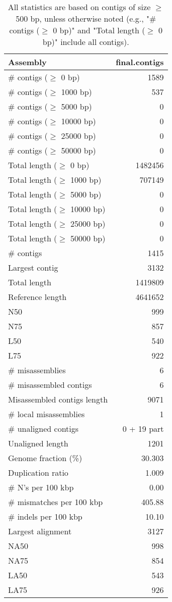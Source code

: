 \documentclass[12pt,a4paper]{article}
\begin{document}
\begin{table}[ht]
\begin{center}
\caption{All statistics are based on contigs of size $\geq$ 500 bp, unless otherwise noted (e.g., "\# contigs ($\geq$ 0 bp)" and "Total length ($\geq$ 0 bp)" include all contigs).}
\begin{tabular}{|l*{1}{|r}|}
\hline
Assembly & final.contigs \\ \hline
\# contigs ($\geq$ 0 bp) & 1589 \\ \hline
\# contigs ($\geq$ 1000 bp) & 537 \\ \hline
\# contigs ($\geq$ 5000 bp) & 0 \\ \hline
\# contigs ($\geq$ 10000 bp) & 0 \\ \hline
\# contigs ($\geq$ 25000 bp) & 0 \\ \hline
\# contigs ($\geq$ 50000 bp) & 0 \\ \hline
Total length ($\geq$ 0 bp) & 1482456 \\ \hline
Total length ($\geq$ 1000 bp) & 707149 \\ \hline
Total length ($\geq$ 5000 bp) & 0 \\ \hline
Total length ($\geq$ 10000 bp) & 0 \\ \hline
Total length ($\geq$ 25000 bp) & 0 \\ \hline
Total length ($\geq$ 50000 bp) & 0 \\ \hline
\# contigs & 1415 \\ \hline
Largest contig & 3132 \\ \hline
Total length & 1419809 \\ \hline
Reference length & 4641652 \\ \hline
N50 & 999 \\ \hline
N75 & 857 \\ \hline
L50 & 540 \\ \hline
L75 & 922 \\ \hline
\# misassemblies & 6 \\ \hline
\# misassembled contigs & 6 \\ \hline
Misassembled contigs length & 9071 \\ \hline
\# local misassemblies & 1 \\ \hline
\# unaligned contigs & 0 + 19 part \\ \hline
Unaligned length & 1201 \\ \hline
Genome fraction (\%) & 30.303 \\ \hline
Duplication ratio & 1.009 \\ \hline
\# N's per 100 kbp & 0.00 \\ \hline
\# mismatches per 100 kbp & 405.88 \\ \hline
\# indels per 100 kbp & 10.10 \\ \hline
Largest alignment & 3127 \\ \hline
NA50 & 998 \\ \hline
NA75 & 854 \\ \hline
LA50 & 543 \\ \hline
LA75 & 926 \\ \hline
\end{tabular}
\end{center}
\end{table}
\end{document}
